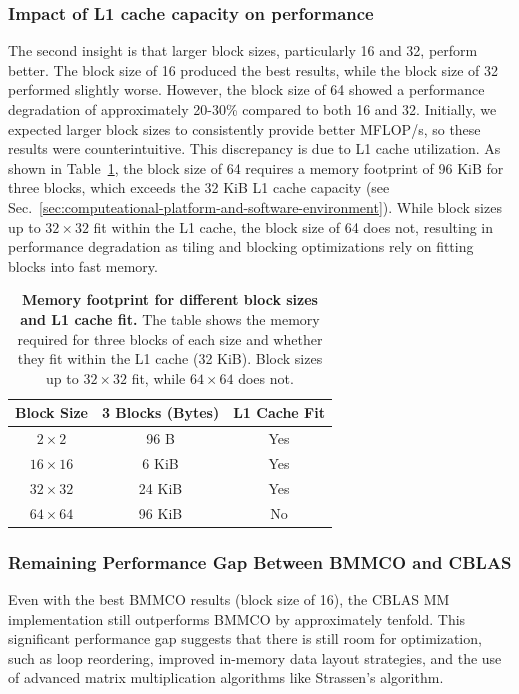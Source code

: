 \subsubsection{Impact of L1 cache capacity on performance}
\label{subsubsec:l1-cache-fit}
The second insight is that larger block sizes, particularly 16 and 32, perform better. The block size of 16 produced the best results, while the block size of 32 performed slightly worse. However, the block size of 64 showed a performance degradation of approximately 20-30\% compared to both 16 and 32. Initially, we expected larger block sizes to consistently provide better MFLOP/s, so these results were counterintuitive. This discrepancy is due to L1 cache utilization. As shown in Table~\ref{tab:memory-footprint-three-blocks-l1-cache}, the block size of 64 requires a memory footprint of 96 KiB for three blocks, which exceeds the 32 KiB L1 cache capacity (see Sec.~\ref{sec:computeational-platform-and-software-environment}). While block sizes up to \(32 \times 32\) fit within the L1 cache, the block size of 64 does not, resulting in performance degradation as tiling and blocking optimizations rely on fitting blocks into fast memory.

\begin{table}[htbp]
    \centering
    \begin{tabular}{c|c|c}
        \textbf{Block Size} & \textbf{3 Blocks (Bytes)} & \textbf{L1 Cache Fit} \\
        \hline
        \(2 \times 2\) & 96 B & Yes \\
        \(16 \times 16\)  & 6 KiB & Yes \\
        \(32 \times 32\)  & 24 KiB & Yes \\
        \(64 \times 64\)  & 96 KiB & No \\
    \end{tabular}
    \caption{\textbf{Memory footprint for different block sizes and L1 cache fit.} The table shows the memory required for three blocks of each size and whether they fit within the L1 cache (32 KiB). Block sizes up to \(32 \times 32\) fit, while \(64 \times 64\) does not.}
    \label{tab:memory-footprint-three-blocks-l1-cache}
\end{table}

\subsubsection{Remaining Performance Gap Between BMMCO and CBLAS}
\label{subsubsec:remaining-performance-gap-between-bmmco-cblas}
Even with the best BMMCO results (block size of 16), the CBLAS MM implementation still outperforms BMMCO by approximately tenfold. This significant performance gap suggests that there is still room for optimization, such as loop reordering, improved in-memory data layout strategies, and the use of advanced matrix multiplication algorithms like Strassen's algorithm.


